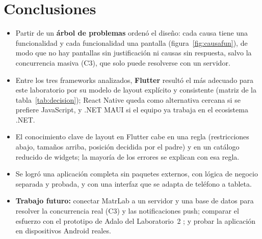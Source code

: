 \section{Conclusiones}
\label{sec:conclusiones}
\begin{itemize}
	\item Partir de un \textbf{árbol de problemas} ordenó el diseño: cada causa tiene una funcionalidad y cada funcionalidad una pantalla (figura~\ref{fig:causafun}), de modo que no hay pantallas sin justificación ni causas sin respuesta, salvo la concurrencia masiva (C3), que solo puede resolverse con un servidor.
	\item Entre los tres frameworks analizados, \textbf{Flutter} resultó el más adecuado para este laboratorio por su modelo de layout explícito y consistente (matriz de la tabla~\ref{tab:decision}); React Native queda como alternativa cercana si se prefiere JavaScript, y .NET MAUI si el equipo ya trabaja en el ecosistema .NET.
	\item El conocimiento clave de layout en Flutter cabe en una regla (restricciones abajo, tamaños arriba, posición decidida por el padre) y en un catálogo reducido de widgets; la mayoría de los errores se explican con esa regla.
	\item Se logró una aplicación completa sin paquetes externos, con lógica de negocio separada y probada, y con una interfaz que se adapta de teléfono a tableta.
	\item \textbf{Trabajo futuro:} conectar MatrLab a un servidor y una base de datos para resolver la concurrencia real (C3) y las notificaciones push; comparar el esfuerzo con el prototipo de Adalo del Laboratorio~2 \cite{lab2}; y probar la aplicación en dispositivos Android reales.
\end{itemize}
